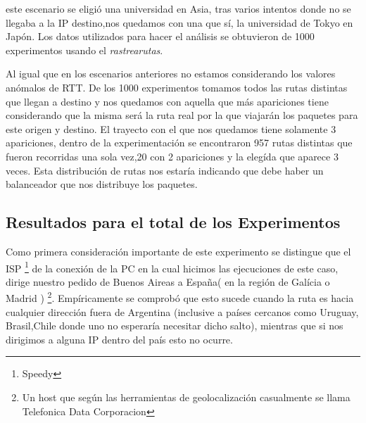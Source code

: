  este escenario se eligi\'o una universidad en Asia, tras varios intentos donde no se llegaba a la IP destino,nos quedamos con una que s\'i, la universidad de Tokyo en Jap\'on.
Los datos utilizados para hacer el an\'alisis se obtuvieron de 1000 experimentos usando el \emph{rastrearutas}. \newline

\par Al igual que en los escenarios anteriores no estamos considerando los valores an\'omalos de RTT. De los 1000 experimentos tomamos todos las rutas distintas que llegan a destino y  nos quedamos con aquella que m\'as apariciones tiene considerando que la misma ser\'a la ruta real por la que viajar\'an los paquetes para este origen y destino. El trayecto con el que nos quedamos tiene solamente 3 apariciones, dentro de la experimentaci\'on se encontraron 957 rutas distintas que fueron recorridas una sola vez,20 con 2 apariciones y la eleg\'ida que aparece 3 veces.
Esta distribuci\'on de rutas nos estar\'ia indicando que debe haber un balanceador que nos distribuye los paquetes. 

\subsection{Resultados para el total de los Experimentos}

\par Como primera consideraci\'on importante de este experimento se distingue que el ISP \footnote{Speedy} de la conexi\'on de la PC en la cual hicimos las ejecuciones de este caso, dirige nuestro pedido de Buenos Aireas a España( en la región de Gal\'icia o Madrid ) \footnote{Un host que seg\'un las herramientas de geolocalizaci\'on casualmente se llama Telefonica Data Corporacion}. Emp\'iricamente se comprob\'o que esto sucede cuando la ruta es hacia cualquier direcci\'on fuera de Argentina (inclusive a pa\'ises cercanos como Uruguay, Brasil,Chile donde uno no esperar\'ia necesitar dicho salto), mientras que si nos    dirigimos a alguna IP dentro del pa\'is esto no ocurre. \newline


\begin{figure*}[htb]
    \centering
    \texttt{[image: img/escenario3/\{tokyouniv\_3.path.978.map]}.pdf}
    \caption{Mapa de Ruta a destino}
    \label{fig:map_tokyo}
\end{figure*}

